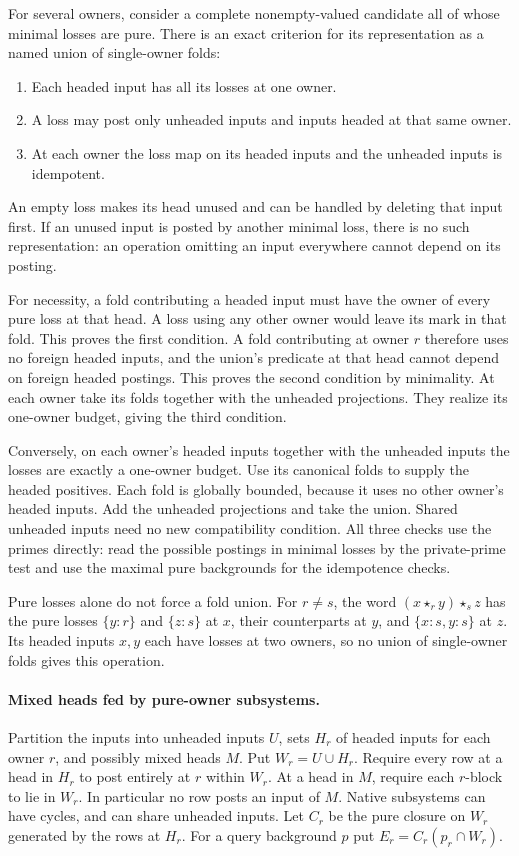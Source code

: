 For several owners, consider a complete nonempty-valued
candidate all of whose minimal losses are pure. There is
an exact criterion for its representation as a named union
of single-owner folds:
\begin{enumerate}
\item Each headed input has all its losses at one owner.
\item A loss may post only unheaded inputs and inputs headed
at that same owner.
\item At each owner the loss map on its headed inputs and
the unheaded inputs is idempotent.
\end{enumerate}
An empty loss makes its head unused and can be handled by
deleting that input first. If an unused input is posted by
another minimal loss, there is no such representation:
an operation omitting an input everywhere cannot depend on
its posting.

For necessity, a fold contributing a headed input must
have the owner of every pure loss at that head. A loss
using any other owner would leave its mark in that fold.
This proves the first condition. A fold contributing at
owner $r$ therefore uses no foreign headed inputs, and
the union's predicate at that head cannot depend on foreign
headed postings. This proves the second condition by
minimality. At each owner take its folds together with the
unheaded projections. They realize its one-owner budget,
giving the third condition.

Conversely, on each owner's headed inputs together with
the unheaded inputs the losses are exactly a one-owner
budget. Use its canonical folds to supply the headed
positives. Each fold is globally bounded, because it uses
no other owner's headed inputs. Add the unheaded projections
and take the union. Shared unheaded inputs need no new
compatibility condition. All three checks use the primes
directly: read the possible postings in minimal losses by
the private-prime test and use the maximal pure backgrounds
for the idempotence checks.

Pure losses alone do not force a fold union. For $r\ne s$,
the word $(x\star_r y)\star_s z$ has the pure losses
$\{y:r\}$ and $\{z:s\}$ at $x$, their counterparts at $y$,
and $\{x:s,y:s\}$ at $z$. Its headed inputs $x,y$ each
have losses at two owners, so no union of single-owner
folds gives this operation.

\paragraph{Mixed heads fed by pure-owner subsystems.}
Partition the inputs into unheaded inputs $U$, sets
$H_r$ of headed inputs for each owner $r$, and possibly
mixed heads $M$. Put $W_r=U\cup H_r$. Require every row
at a head in $H_r$ to post entirely at $r$ within $W_r$.
At a head in $M$, require each $r$-block to lie in $W_r$.
In particular no row posts an input of $M$. Native
subsystems can have cycles, and can share unheaded inputs.
Let $C_r$ be the pure closure on $W_r$ generated by the
rows at $H_r$. For a query background $p$ put
$E_r=C_r(p_r\cap W_r)$.

